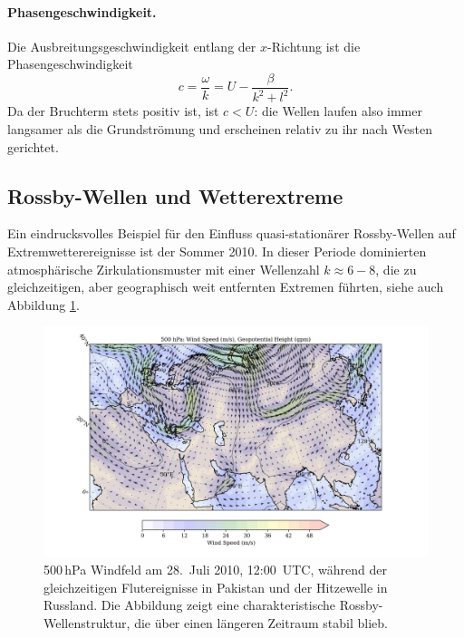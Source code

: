 \paragraph{Phasengeschwindigkeit.}
Die Ausbreitungsgeschwindigkeit entlang der $x$-Richtung ist die
Phasengeschwindigkeit
\begin{equation}
	c = \frac{\omega}{k} = U - \frac{\beta}{k^2+l^2}.
	\label{rossby:phasengeschwindigkeit}
\end{equation}
Da der Bruchterm stets positiv ist, ist $c < U$:
die Wellen laufen also immer langsamer als die Grundströmung
und erscheinen relativ zu ihr nach Westen gerichtet.

\subsection{Rossby-Wellen und Wetterextreme}




Ein eindrucksvolles Beispiel für den Einfluss quasi-stationärer Rossby-Wellen
auf Extremwetterereignisse ist der Sommer 2010. In dieser Periode dominierten
atmosphärische Zirkulationsmuster mit einer Wellenzahl \(k \approx 6 - 8\), die zu
gleichzeitigen, aber geographisch weit entfernten Extremen führten, siehe auch Abbildung \ref{fig:rossby_2010}.


\begin{figure}
	\centering
	\includegraphics[width=\textwidth, trim=2cm 0cm 3cm 0cm, clip]{papers/rossby/images/data_2010_7_28_12_00_500.jpg}
	\caption{500\,hPa Windfeld am
		28.\ Juli 2010, 12:00~UTC, während der gleichzeitigen Flutereignisse in Pakistan und
		der Hitzewelle in Russland. Die Abbildung zeigt eine charakteristische Rossby-Wellenstruktur,
		die über einen längeren Zeitraum stabil blieb.}
	\label{fig:rossby_2010}
\end{figure}



